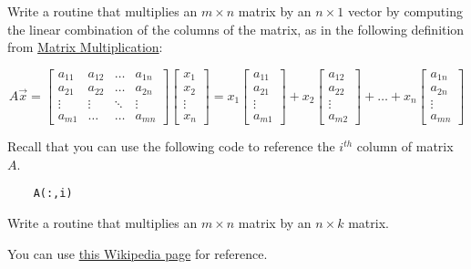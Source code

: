 \documentclass{ximera}
\begin{document}
\begin{problem}\label{prob_oct_mat2}
Write a routine that multiplies an $m\times n$ matrix by an $n\times 1$ vector by computing the linear combination of the columns of the matrix, as in the following definition from \href{https://ximera.osu.edu/linearalgebradzv3/LinearAlgebraInteractiveIntro/MAT-0020/main}{Matrix Multiplication}:

$$A\vec{x}=\begin{bmatrix}
           a_{11} & a_{12}&\dots&a_{1n}\\
           a_{21}&a_{22} &\dots &a_{2n}\\
        \vdots & \vdots&\ddots &\vdots\\
        a_{m1}&\dots &\dots &a_{mn}
         \end{bmatrix}\begin{bmatrix}x_1\\x_2\\\vdots\\x_n\end{bmatrix}=
         x_1\begin{bmatrix}a_{11}\\a_{21}\\ \vdots \\a_{m1}\end{bmatrix}+
         x_2\begin{bmatrix}a_{12}\\a_{22}\\ \vdots \\a_{m2}\end{bmatrix}+\dots+
         x_n\begin{bmatrix}a_{1n}\\a_{2n}\\ \vdots \\a_{mn}\end{bmatrix}$$

 \begin{hint}
 Recall that you can use the following code to reference the $i^{th}$ column of matrix $A$.
 \begin{verbatim}
    A(:,i)
 \end{verbatim}
 \end{hint}        
\end{problem}

\begin{problem}\label{prob_oct_6}
    Write a routine that multiplies an $m\times n$ matrix by an $n\times k$ matrix.  

    \begin{hint}
        You can use \href{https://en.wikipedia.org/wiki/Matrix_multiplication_algorithm}{this Wikipedia page} for reference.
    \end{hint}    
\end{problem}
\end{document}
